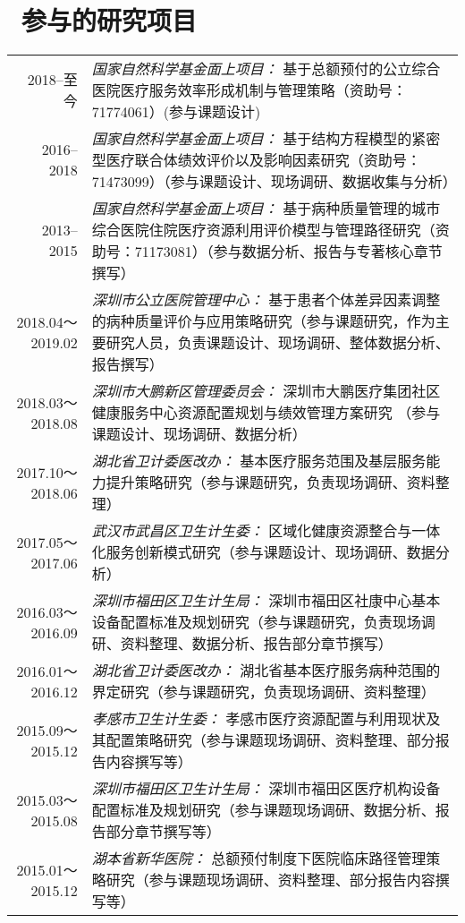 \documentclass{resume}
\begin{document}
\section{\faPuzzlePiece\ 参与的研究项目}
\begin{longtable}{r p{13.3cm}}
2018--至今 & \textit{国家自然科学基金面上项目：} 基于总额预付的公立综合医院医疗服务效率形成机制与管理策略（资助号：71774061）(参与课题设计)\\
2016--2018 & \textit{国家自然科学基金面上项目：} 基于结构方程模型的紧密型医疗联合体绩效评价以及影响因素研究（资助号：71473099）（参与课题设计、现场调研、数据收集与分析）\\
2013--2015 & \textit{国家自然科学基金面上项目：} 基于病种质量管理的城市综合医院住院医疗资源利用评价模型与管理路径研究（资助号：71173081）（参与数据分析、报告与专著核心章节撰写）\\
2018.04～2019.02 & \textit{深圳市公立医院管理中心：} 基于患者个体差异因素调整的病种质量评价与应用策略研究（参与课题研究，作为主要研究人员，负责课题设计、现场调研、整体数据分析、 报告撰写）\\
2018.03～2018.08 & \textit{深圳市大鹏新区管理委员会：} 深圳市大鹏医疗集团社区健康服务中心资源配置规划与绩效管理方案研究 （参与课题设计、现场调研、数据分析）\\
2017.10～2018.06 & \textit{湖北省卫计委医改办：} 基本医疗服务范围及基层服务能力提升策略研究（参与课题研究，负责现场调研、资料整理）\\
2017.05～2017.06 & \textit{武汉市武昌区卫生计生委：} 区域化健康资源整合与一体化服务创新模式研究（参与课题设计、现场调研、数据分析）\\
2016.03～2016.09 & \textit{深圳市福田区卫生计生局：} 深圳市福田区社康中心基本设备配置标准及规划研究（参与课题研究，负责现场调研、资料整理、数据分析、报告部分章节撰写）\\
2016.01～2016.12 & \textit{湖北省卫计委医改办：} 湖北省基本医疗服务病种范围的界定研究（参与课题研究，负责现场调研、资料整理）\\
2015.09～2015.12 & \textit{孝感市卫生计生委：} 孝感市医疗资源配置与利用现状及其配置策略研究（参与课题现场调研、资料整理、部分报告内容撰写等）\\
2015.03～2015.08 & \textit{深圳市福田区卫生计生局：} 深圳市福田区医疗机构设备配置标准及规划研究（参与课题现场调研、数据分析、报告部分章节撰写等）\\
2015.01～2015.12 & \textit{湖本省新华医院：} 总额预付制度下医院临床路径管理策略研究（参与课题现场调研、资料整理、部分报告内容撰写等）\\
\end{longtable}
\end{document}
